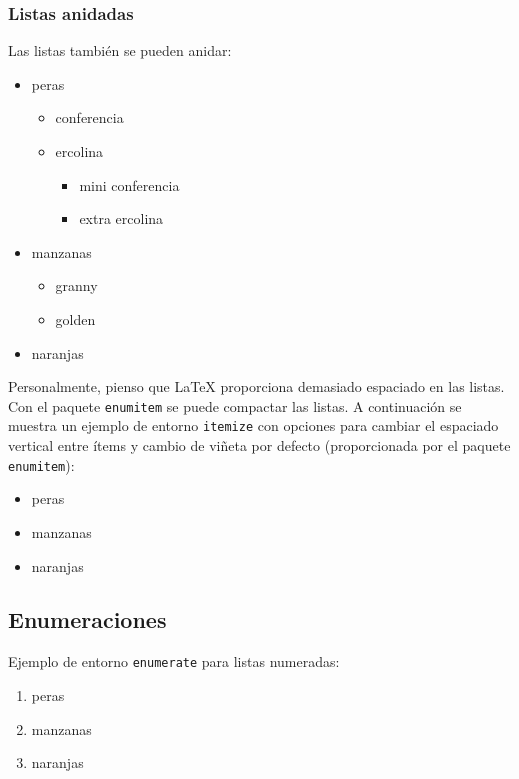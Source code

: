 \documentclass[11pt,a4paper]{article}
\begin{document}
\subsubsection{Listas anidadas}
\noindent Las listas también se pueden anidar:
\begin{itemize}
	\item peras
	\begin{itemize}
		\item conferencia
		\item ercolina
    	\begin{itemize}
    		\item mini conferencia
    		\item extra ercolina
    	\end{itemize}
	\end{itemize}
	\item manzanas
	\begin{itemize}
		\item granny
		\item golden 
	\end{itemize}
	\item naranjas
\end{itemize}

Personalmente, pienso que \LaTeX{} proporciona demasiado espaciado en las listas. Con el paquete \texttt{enumitem} se puede compactar las listas. A continuación se muestra un ejemplo de entorno {\tt itemize} con opciones para cambiar el espaciado vertical entre ítems y cambio de viñeta por defecto (proporcionada por el paquete \texttt{enumitem}):

\begin{itemize}[\textbullet,noitemsep]
	\item peras
	\item manzanas
	\item naranjas
\end{itemize}


\subsection{Enumeraciones}
\noindent Ejemplo de entorno {\tt enumerate} para listas numeradas:

\begin{enumerate}
	\item peras
	\item manzanas
	\item naranjas
\end{enumerate}
\end{document}
